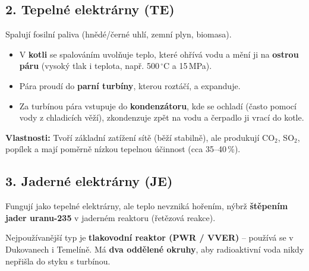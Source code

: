 \documentclass[a4paper,10pt]{article}
\begin{document}
\begin{vysvetlenibox}
\subsection*{2. Tepelné elektrárny (TE)}

Spalují fosilní paliva (hnědé/černé uhlí, zemní plyn, biomasa).
\begin{itemize}
  \item V \textbf{kotli} se spalováním uvolňuje teplo, které ohřívá vodu a mění ji na \textbf{ostrou páru} (vysoký tlak i teplota, např. 500\,$^\circ\mathrm{C}$ a 15\,MPa).
  \item Pára proudí do \textbf{parní turbíny}, kterou roztáčí, a expanduje.
  \item Za turbínou pára vstupuje do \textbf{kondenzátoru}, kde se ochladí (často pomocí vody z chladicích věží), zkondenzuje zpět na vodu a čerpadlo ji vrací do kotle.
\end{itemize}
\textbf{Vlastnosti:} Tvoří základní zatížení sítě (běží stabilně), ale produkují CO$_2$, SO$_2$, popílek a mají poměrně nízkou tepelnou účinnost (cca 35--40\,\%).

\subsection*{3. Jaderné elektrárny (JE)}

Fungují jako tepelné elektrárny, ale teplo nevzniká hořením, nýbrž \textbf{štěpením jader uranu-235} v jaderném reaktoru (řetězová reakce).

Nejpoužívanější typ je \textbf{tlakovodní reaktor (PWR / VVER)} – používá se v Dukovanech i Temelíně.
Má \textbf{dva oddělené okruhy}, aby radioaktivní voda nikdy nepřišla do styku s turbínou.

\begin{center}
\end{center}
\end{vysvetlenibox}
\end{document}

